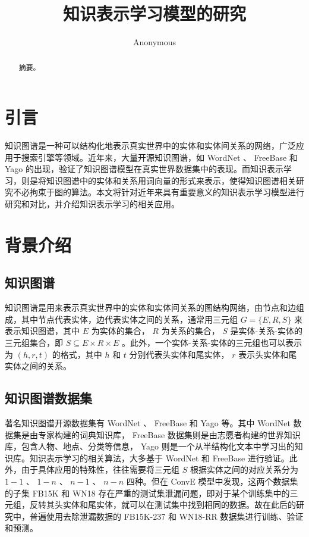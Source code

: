 \documentclass{llncs}
\begin{document}
\title{知识表示学习模型的研究}
\author{Anonymous}
\maketitle

\begin{abstract}

摘要。


\end{abstract}

\section{引言}

知识图谱是一种可以结构化地表示真实世界中的实体和实体间关系的网络，广泛应用于搜索引擎等领域。近年来，大量开源知识图谱，如 WordNet\cite{Miller:1995:WLD:219717.219748} 、 FreeBase\cite{Bollacker:2008:FCC:1376616.1376746} 和 Yago\cite{suchanek2007yago} 的出现，验证了知识图谱模型在真实世界数据集中的表现。而知识表示学习\cite{DBLP:journals/corr/abs-1812-10901}，则是将知识图谱中的实体和关系用词向量的形式来表示，使得知识图谱相关研究不必拘束于图的算法。本文将针对近年来具有重要意义的知识表示学习模型进行研究和对比，并介绍知识表示学习的相关应用。

\section{背景介绍}

\subsection{知识图谱}

知识图谱是用来表示真实世界中的实体和实体间关系的图结构网络，由节点和边组成，其中节点代表实体，边代表实体之间的关系，通常用三元组 $G=\{E,R,S\}$ 来表示知识图谱，其中 $E$ 为实体的集合， $R$ 为关系的集合， $S$ 是实体-关系-实体的三元组集合，即 $S\subseteq{E×R×E}$ 。此外，一个实体-关系-实体的三元组也可以表示为 $(h,r,t)$ 的格式，其中 $h$ 和 $t$ 分别代表头实体和尾实体， $r$ 表示头实体和尾实体之间的关系。

\subsection{知识图谱数据集}

著名知识图谱开源数据集有 WordNet 、 FreeBase 和 Yago 等。其中 WordNet 数据集是由专家构建的词典知识库， FreeBase 数据集则是由志愿者构建的世界知识库，包含人物、地点、分类等信息， Yago 则是一个从半结构化文本中学习出的知识库。知识表示学习的相关算法，大多基于 WordNet 和 FreeBase 进行验证。此外，由于具体应用的特殊性，往往需要将三元组 $S$ 根据实体之间的对应关系分为 $1-1$ 、 $1-n$ 、 $n-1$ 、 $n-n$ 四种。但在 ConvE 模型\cite{DBLP:conf/aaai/DettmersMS018}中发现，这两个数据集的子集 FB15K 和 WN18 存在严重的测试集泄漏问题，即对于某个训练集中的三元组，反转其头实体和尾实体，就可以在测试集中找到相同的数据。故在此后的研究中，普遍使用去除泄漏数据的 FB15K-237 和 WN18-RR 数据集进行训练、验证和预测。
\end{document}
